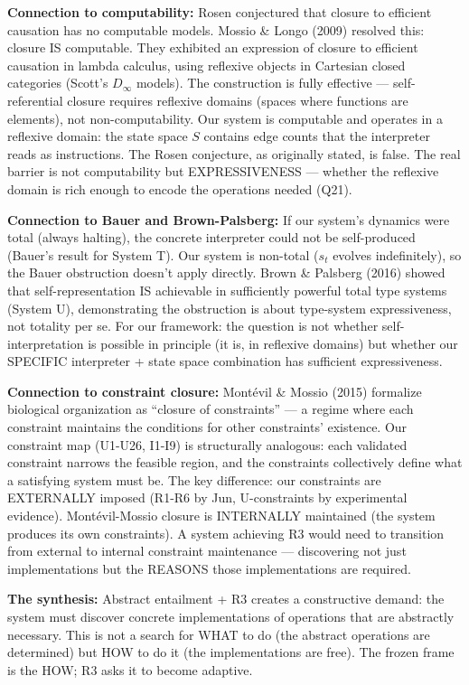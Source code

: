 \documentclass[
  11pt,
]{article}
\begin{document}
\textbf{Connection to computability:} Rosen conjectured that closure to
efficient causation has no computable models. Mossio \& Longo (2009)
resolved this: closure IS computable. They exhibited an expression of
closure to efficient causation in lambda calculus, using reflexive
objects in Cartesian closed categories (Scott's \(D_\infty\) models).
The construction is fully effective --- self-referential closure
requires reflexive domains (spaces where functions are elements), not
non-computability. Our system is computable and operates in a reflexive
domain: the state space \(S\) contains edge counts that the interpreter
reads as instructions. The Rosen conjecture, as originally stated, is
false. The real barrier is not computability but EXPRESSIVENESS ---
whether the reflexive domain is rich enough to encode the operations
needed (Q21).

\textbf{Connection to Bauer and Brown-Palsberg:} If our system's
dynamics were total (always halting), the concrete interpreter could not
be self-produced (Bauer's result for System T). Our system is non-total
(\(s_t\) evolves indefinitely), so the Bauer obstruction doesn't apply
directly. Brown \& Palsberg (2016) showed that self-representation IS
achievable in sufficiently powerful total type systems (System U),
demonstrating the obstruction is about type-system expressiveness, not
totality per se. For our framework: the question is not whether
self-interpretation is possible in principle (it is, in reflexive
domains) but whether our SPECIFIC interpreter + state space combination
has sufficient expressiveness.

\textbf{Connection to constraint closure:} Montévil \& Mossio (2015)
formalize biological organization as ``closure of constraints'' --- a
regime where each constraint maintains the conditions for other
constraints' existence. Our constraint map (U1-U26, I1-I9) is
structurally analogous: each validated constraint narrows the feasible
region, and the constraints collectively define what a satisfying system
must be. The key difference: our constraints are EXTERNALLY imposed
(R1-R6 by Jun, U-constraints by experimental evidence). Montévil-Mossio
closure is INTERNALLY maintained (the system produces its own
constraints). A system achieving R3 would need to transition from
external to internal constraint maintenance --- discovering not just
implementations but the REASONS those implementations are required.

\textbf{The synthesis:} Abstract entailment + R3 creates a constructive
demand: the system must discover concrete implementations of operations
that are abstractly necessary. This is not a search for WHAT to do (the
abstract operations are determined) but HOW to do it (the
implementations are free). The frozen frame is the HOW; R3 asks it to
become adaptive.
\end{document}
